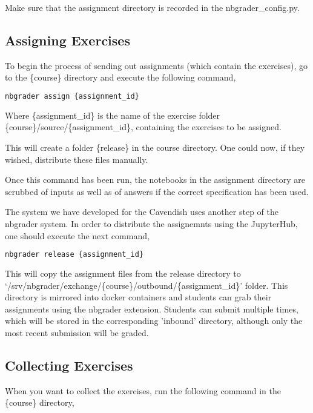     Make sure that the assignment directory is recorded in the nbgrader\_config.py.
    
    \subsection{Assigning Exercises}
    
    To begin the process of sending out assignments (which contain the exercises), go to the \{course\} directory and execute the following command,
    
    \begin{lstlisting}[frame=single,language=Bash]
    nbgrader assign {assignment_id}
    \end{lstlisting}
    
    Where \{assignment\_id\} is the name of the exercise folder \{course\}/source/\{assignment\_id\}, containing the exercises to be assigned.
    
    This will create a folder \{release\} in the course directory. One could now, if they wished, distribute these files manually.
    
    Once this command has been run, the notebooks in the assignment directory are scrubbed of inputs as well as of answers if the correct specification has been used.
    
    The system we have developed for the Cavendish uses another step of the nbgrader system. In order to distribute the assignemnts using the JupyterHub, one should execute the next command,
    
    \begin{lstlisting}[frame=single,language=Bash]
    nbgrader release {assignment_id}
    \end{lstlisting}
    
    This will copy the assignment files from the release directory to `/srv/nbgrader/exchange/\{course\}/outbound/\{assignment\_id\}' folder. This directory is mirrored into docker containers and students can grab their assignments using the nbgrader extension. Students can submit multiple times, which will be stored in the corresponding 'inbound' directory, although only the most recent submission will be graded.
    
    \subsection{Collecting Exercises}
    
    When you want to collect the exercises, run the following command in the \{course\} directory,
    
